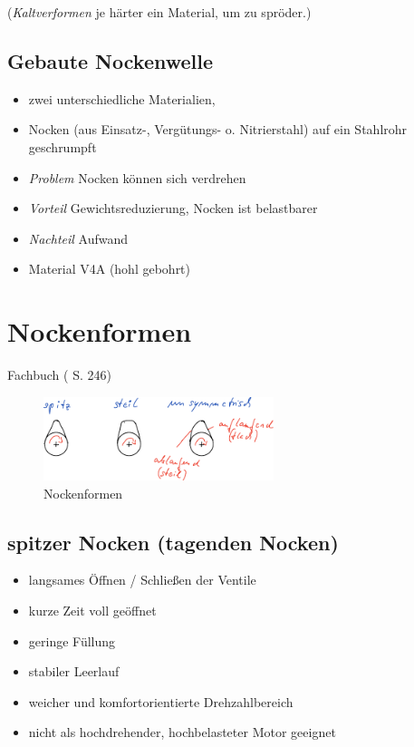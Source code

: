 (\emph{Kaltverformen} je härter ein Material, um zu spröder.)

\subsection{Gebaute Nockenwelle}\label{gebaute-nockenwelle}

\begin{itemize}
\item
  zwei unterschiedliche Materialien,
\item
  Nocken (aus Einsatz-, Vergütungs- o. Nitrierstahl) auf ein Stahlrohr
  geschrumpft
\item
  \emph{Problem} Nocken können sich verdrehen
\item
  \emph{Vorteil} Gewichtsreduzierung, Nocken ist belastbarer
\item
  \emph{Nachteil} Aufwand
\item
  Material V4A (hohl gebohrt)
\end{itemize}

\section{Nockenformen}\label{nockenformen}

Fachbuch (\textcite{brand:2020:fachkundeKfz} S. 246)

\begin{figure}[!ht]%
\centering
\includegraphics[width=0.6\textwidth]{images/Skizze/02_Nockenformen_Skizze.pdf}
\caption{Nockenformen}
\end{figure}

\subsection{spitzer Nocken (tagenden
Nocken)}\label{spitzer-nocken-tagenden-nocken}

\begin{itemize}
\item
  langsames Öffnen / Schließen der Ventile
\item
  kurze Zeit voll geöffnet\\
\item
  geringe Füllung
\item
  stabiler Leerlauf
\item
  weicher und komfortorientierte Drehzahlbereich
\item
  nicht als hochdrehender, hochbelasteter Motor geeignet
\end{itemize}

